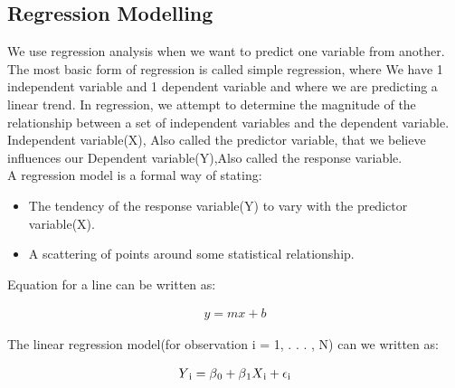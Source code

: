 {\subsection{Regression Modelling }

We use regression analysis when we want to predict one variable from another. The most basic form of regression is called simple regression, where We have 1 independent variable and 1 dependent variable and where we are predicting a linear trend. In regression, we attempt to determine the magnitude of the relationship between a set of independent variables and the dependent variable. Independent variable(X), Also called the predictor variable, that we believe influences our Dependent variable(Y),Also called the response variable\cite{lenarreg2006}.\\

A regression model is a formal way of stating:
\begin{itemize}
\item The tendency of the response variable(Y) to vary with the predictor variable(X).
\item A scattering of points around some statistical relationship.
\end {itemize}

Equation for a line can be written as:

\begin{equation}
\begin{aligned}
  y= mx + b 
\label{eq:Line_equ}
\end{aligned}
\end{equation}

The linear regression model(for observation i = 1, . . . , N) can we written as:

\begin{equation}
\begin{aligned}
  Y\textsubscript{i}= \beta\textsubscript{0}+\beta\textsubscript{1}X\textsubscript{i} +\epsilon\textsubscript{i}
\label{eq:Line_equ}
\end{aligned}
\end{equation}

}
